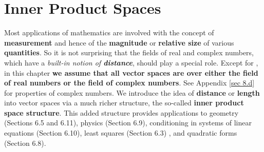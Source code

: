 \chapter{Inner Product Spaces} \label{ch 6}

Most applications of mathematics are involved with the concept of \textbf{measurement} and hence of the \textbf{magnitude} or \textbf{relative size} of various \textbf{quantities}.
So it is not surprising that the fields of real and complex numbers, which have a \emph{built-in notion of \textbf{distance}}, should play a special role.
Except for , in this chapter \textbf{we assume that all vector spaces are over either the field of real numbers or the field of complex numbers}.
See Appendix \ref{sec 8.d} for properties of complex numbers.
We introduce the idea of \textbf{distance} or \textbf{length} into vector spaces via a much richer structure, the so-called \textbf{inner product space structure}.
This added structure provides applications to geometry (Sections 6.5 and 6.11), physics (Section 6.9), conditioning in systems of linear equations (Section 6.10), least squares (Section 6.3) , and quadratic forms (Section 6.8).









